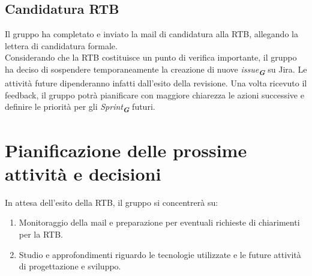 \documentclass[a4paper,12pt]{article}
\newcommand{\glossario}[1]{\textit{#1}\textsubscript{\textbf{\textit{\textcolor{lightblack}{G}}}}}
\begin{document}
\subsection{Candidatura RTB}
Il gruppo ha completato e inviato la mail di candidatura alla RTB, allegando la lettera di candidatura formale.\\
Considerando che la RTB costituisce un punto di verifica importante, il gruppo ha deciso di sospendere temporaneamente la creazione di nuove \glossario{issue} su Jira. Le attività future dipenderanno infatti dall'esito della revisione. Una volta ricevuto il feedback, il gruppo potrà pianificare con maggiore chiarezza le azioni successive e definire le priorità per gli \glossario{Sprint} futuri.\\


\section{Pianificazione delle prossime attività e decisioni}
In attesa dell'esito della RTB, il gruppo si concentrerà su:
\begin{enumerate}[noitemsep]
    \item Monitoraggio della mail e preparazione per eventuali richieste di chiarimenti per la RTB.
    \item Studio e approfondimenti riguardo le tecnologie utilizzate e le future attività di progettazione e sviluppo.
\end{enumerate}
\end{document}
